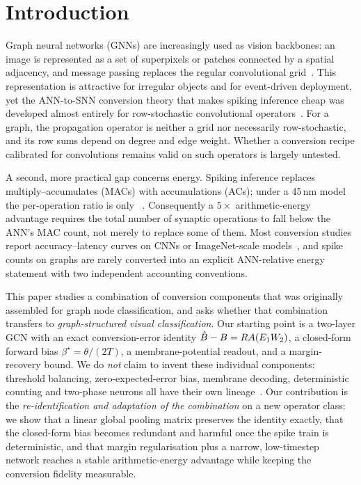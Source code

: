 \section{Introduction}
\label{sec:intro}

Graph neural networks (GNNs) are increasingly used as vision backbones: an image is represented as a set of superpixels or patches connected by a spatial adjacency, and message passing replaces the regular convolutional grid~\cite{dwivedi2023,han2022vig,achanta2012}. This representation is attractive for irregular objects and for event-driven deployment, yet the ANN-to-SNN conversion theory that makes spiking inference cheap was developed almost entirely for row-stochastic convolutional operators~\cite{diehl2015,rueckauer2017,sengupta2019,deng2021,bu2022qcfs}. For a graph, the propagation operator is neither a grid nor necessarily row-stochastic, and its row sums depend on degree and edge weight. Whether a conversion recipe calibrated for convolutions remains valid on such operators is largely untested.

A second, more practical gap concerns energy. Spiking inference replaces multiply--accumulates (MACs) with accumulations (ACs); under a 45\,nm model the per-operation ratio is only \MACACRatio~\cite{horowitz2014}. Consequently a $5\times$ arithmetic-energy advantage requires the total number of synaptic operations to fall below the ANN's MAC count, not merely to replace some of them. Most conversion studies report accuracy--latency curves on CNNs or ImageNet-scale models~\cite{wu2024ftbc,bojkovic2025tpp,hao2025parallel,huang2025dcgs}, and spike counts on graphs are rarely converted into an explicit ANN-relative energy statement with two independent accounting conventions.

This paper studies a combination of conversion components that was originally assembled for graph node classification, and asks whether that combination transfers to \emph{graph-structured visual classification}. Our starting point is a two-layer GCN with an exact conversion-error identity $\hat{B} - B = R A(E_1W_2)$, a closed-form forward bias $\beta^\star=\theta/(2T)$, a membrane-potential readout, and a margin-recovery bound. We do \emph{not} claim to invent these individual components: threshold balancing, zero-expected-error bias, membrane decoding, deterministic counting and two-phase neurons all have their own lineage~\cite{deng2021,bu2022qcfs,wu2024ftbc,dualphase2024,bojkovic2025tpp,ramesh2025pascal}. Our contribution is the \emph{re-identification and adaptation of the combination} on a new operator class: we show that a linear global pooling matrix preserves the identity exactly, that the closed-form bias becomes redundant and harmful once the spike train is deterministic, and that margin regularisation plus a narrow, low-timestep network reaches a stable arithmetic-energy advantage while keeping the conversion fidelity measurable.

